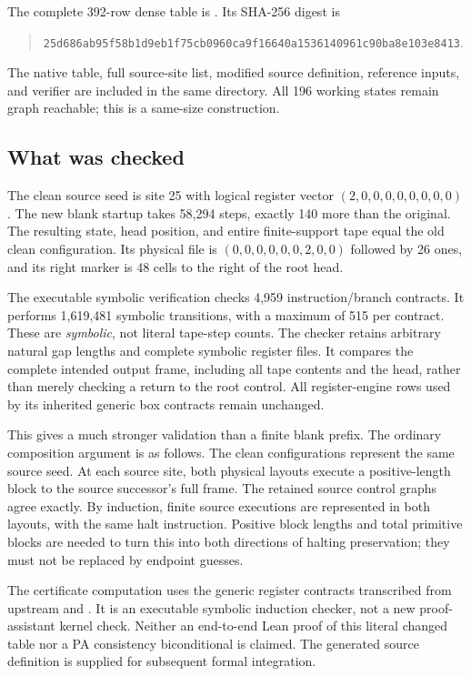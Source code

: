 The complete 392-row dense table is
. Its SHA-256 digest is
\begin{quote}\small
\nolinkurl{25d686ab95f58b1d9eb1f75cb0960ca9f16640a1536140961c90ba8e103e8413}.
\end{quote}
The native table, full source-site list, modified source definition, reference
inputs, and verifier are included in the same directory. All 196 working
states remain graph reachable; this is a same-size construction.

\subsection{What was checked}

The clean source seed is site 25 with logical register vector
$(2,0,0,0,0,0,0,0,0)$. The new blank startup takes 58,294 steps, exactly
140 more than the original. The resulting state, head position, and entire
finite-support tape equal the old clean configuration. Its physical file
is $(0,0,0,0,0,0,2,0,0)$ followed by 26 ones, and its right marker is 48
cells to the right of the root head.

The executable symbolic verification checks 4,959 instruction/branch
contracts. It performs 1,619,481 symbolic transitions, with a maximum of
515 per contract. These are \emph{symbolic}, not literal tape-step counts.
The checker retains arbitrary natural gap lengths and complete symbolic
register files. It compares the complete intended output frame, including
all tape contents and the head, rather than merely checking a return to the
root control. All register-engine rows used by its inherited generic box
contracts remain unchanged.

This gives a much stronger validation than a finite blank prefix. The
ordinary composition argument is as follows. The clean configurations
represent the same source seed. At each source site, both physical layouts
execute a positive-length block to the source successor's full frame.
The retained source control graphs agree exactly. By induction, finite
source executions are represented in both layouts, with the same halt
instruction. Positive block lengths and total primitive blocks are needed
to turn this into both directions of halting preservation; they must not be
replaced by endpoint guesses.

The certificate computation uses the generic register contracts transcribed
from upstream  and . It is an
executable symbolic induction checker, not a new proof-assistant kernel
check. Neither an end-to-end Lean proof of this literal changed table nor a
PA consistency biconditional is claimed. The generated source definition is
supplied for subsequent formal integration.


